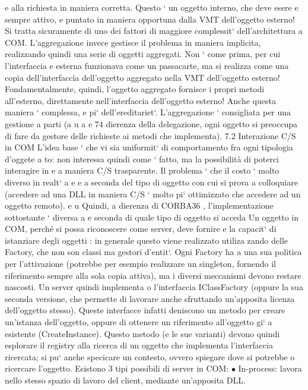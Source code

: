 \documentclass[a4paper,12pt]{article}
\begin{document}
e
alla richiesta in maniera corretta. Questo ` un oggetto interno, che deve esere
e
sempre attivo, e puntato in maniera opportuna dalla VMT dell'oggetto esterno!
Si tratta sicuramente di uno dei fattori di maggiore complessit` dell'architettura
a
COM.
L'aggregazione invece gestisce il problema in maniera implicita, realizzando
quindi una serie di oggetti aggregati. Non ` come prima, per cui l'interfaccia
e
esterna funzionava come un passacarte, ma si realizza come una copia dell'interfaccia dell'oggetto aggregato nella VMT
dell'oggetto esterno! Fondamentalmente, quindi, l'oggetto aggregato fornisce i propri metodi all'esterno, direttamente
nell'interfaccia dell'oggetto esterno! Anche questa maniera ` complessa,
e
pi` dell'ereditariet`. L'aggregazione ` consigliata per una gestione a parti (a
u
a
e
74
dierenza della delegazione, ogni oggetto si preoccupa di fare da gestore delle
richieste ai metodi che implementa).
7.2
Interazione C/S in COM
L'idea base ` che vi sia uniformit` di comportamento fra ogni tipologia d'oggete
a
to: non interessa quindi come ` fatto, ma la possibilità di poterci interagire in
e
a
maniera C/S trasparente. Il problema ` che il costo ` molto diverso in realt` a
e
e
a
seconda del tipo di oggetto con cui si prova a colloquiare (accedere ad una DLL
in maniera C/S ` molto pi` ottimizzato che accedere ad un oggetto remoto).
e
u
Quindi, a dierenza di CORBA36 , l'implementazione sottostante ` diversa a
e
seconda di quale tipo di oggetto si acceda
Un oggetto in COM, perché si possa riconoscere come server, deve fornire
e
la capacit` di istanziare degli oggetti : in generale questo viene realizzato utiliza
zando delle Factory, che non son classi ma gestori d'entit`. Ogni Factory ha
a
una sua politica per l'attivazione (potrebbe per esempio realizzare un singleton,
fornendo il riferimento sempre alla sola copia attiva), ma i diversi meccanismi
devono restare nascosti.
Un server quindi implementa o l'interfaccia IClassFactory (oppure la sua
seconda versione, che permette di lavorare anche sfruttando un'apposita licenza dell'oggetto stesso). Queste interfacce
infatti deniscono un metodo per
creare un'istanza dell'oggetto, oppure di ottenere un riferimento all'oggetto gi`
a
esistente (CreateInstance). Questo metodo (e le sue varianti) devono quindi
esplorare il registry alla ricerca di un oggetto che implementa l'interfaccia ricercata; si pu` anche specicare un
contesto, ovvero spiegare dove si potrebbe
o
ricercare l'oggetto.
Esistono 3 tipi possibili di server in COM:
$\bullet$ In-process: lavora nello stesso spazio di lavoro del client, mediante un'apposita DLL.
\end{document}
